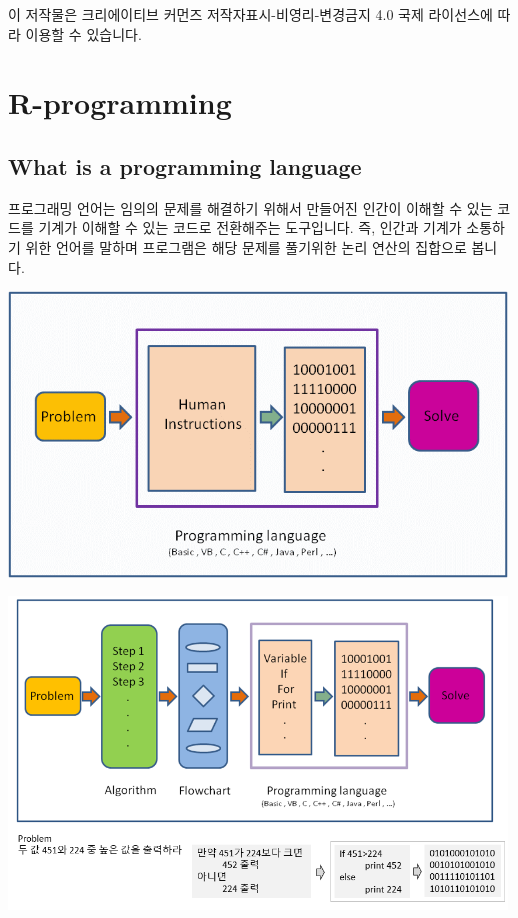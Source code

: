 \documentclass[
  a4paper,
]{book}
\begin{document}
이 저작물은 크리에이티브 커먼즈 저작자표시-비영리-변경금지 4.0 국제
라이선스에 따라 이용할 수 있습니다.


\hypertarget{r-programming}{%
\chapter{R-programming}\label{r-programming}}

\hypertarget{what-is-a-programming-language}{%
\section{What is a programming
language}\label{what-is-a-programming-language}}

프로그래밍 언어는 임의의 문제를 해결하기 위해서 만들어진 인간이 이해할
수 있는 코드를 기계가 이해할 수 있는 코드로 전환해주는 도구입니다. 즉,
인간과 기계가 소통하기 위한 언어를 말하며 프로그램은 해당 문제를
풀기위한 논리 연산의 집합으로 봅니다.

\includegraphics[width=5.20833in,height=\textheight]{images/01/24.PNG}

\includegraphics[width=5.20833in,height=\textheight]{images/01/25.PNG}
\end{document}
